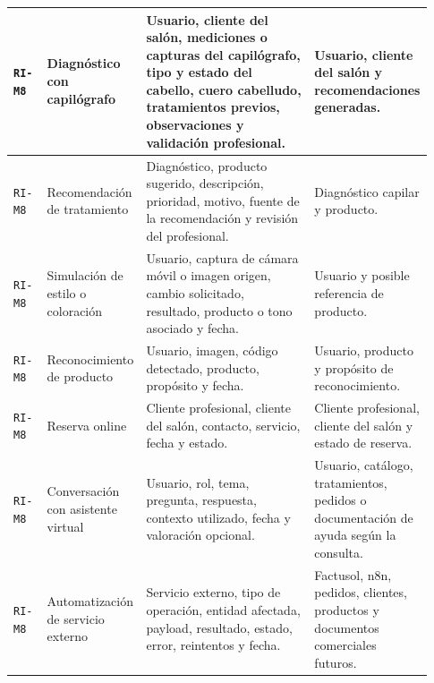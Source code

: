 {\begin{supertabular}{|>{\raggedright\arraybackslash}p{0.08\linewidth}|>{\raggedright\arraybackslash}p{0.22\linewidth}|>{\raggedright\arraybackslash}p{0.40\linewidth}|>{\raggedright\arraybackslash}p{0.23\linewidth}|}
\hline
{}
\texttt{RI-M8} & Diagnóstico con capilógrafo & Usuario, cliente del salón, mediciones o capturas del capilógrafo, tipo y estado del cabello, cuero cabelludo, tratamientos previos, observaciones y validación profesional. & Usuario, cliente del salón y recomendaciones generadas. \\
\hline
\texttt{RI-M8} & Recomendación de tratamiento & Diagnóstico, producto sugerido, descripción, prioridad, motivo, fuente de la recomendación y revisión del profesional. & Diagnóstico capilar y producto. \\
\hline
\texttt{RI-M8} & Simulación de estilo o coloración & Usuario, captura de cámara móvil o imagen origen, cambio solicitado, resultado, producto o tono asociado y fecha. & Usuario y posible referencia de producto. \\
\hline
\texttt{RI-M8} & Reconocimiento de producto & Usuario, imagen, código detectado, producto, propósito y fecha. & Usuario, producto y propósito de reconocimiento. \\
\hline
\texttt{RI-M8} & Reserva online & Cliente profesional, cliente del salón, contacto, servicio, fecha y estado. & Cliente profesional, cliente del salón y estado de reserva. \\
\hline
\texttt{RI-M8} & Conversación con asistente virtual & Usuario, rol, tema, pregunta, respuesta, contexto utilizado, fecha y valoración opcional. & Usuario, catálogo, tratamientos, pedidos o documentación de ayuda según la consulta. \\
\hline
\texttt{RI-M8} & Automatización de servicio externo & Servicio externo, tipo de operación, entidad afectada, payload, resultado, estado, error, reintentos y fecha. & Factusol, n8n, pedidos, clientes, productos y documentos comerciales futuros. \\
\hline
\end{supertabular}
}
